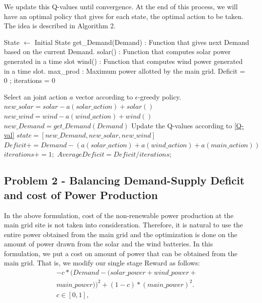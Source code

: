 \documentclass[conference]{IEEEtran}
\begin{document}
We update this Q-values until convergence. At the end of this process, we will have an optimal policy that gives for each state, the optimal action to be taken. The idea is described in  Algorithm 2. 

\begin{algorithm}
\caption{}
\label{q-learning}
\begin{algorithmic}[1]
	\State  State $\leftarrow$ Initial State 
    \State get\_Demand(Demand) : Function that gives next Demand based on the current Demand.
   \State solar() : Function that computes solar power generated in a time slot
    \State wind() : Function that computes wind power generated in a time slot.
    \State max\_prod : Maximum power allotted by the main grid.
    \State Deficit = 0 ; iterations = 0
     
     \State Select an joint action $a$ vector according to $\epsilon$-greedy policy.
     \State $new\_solar = solar - a(solar\_action) + solar()$
     \State $new\_wind = wind - a(wind\_action) + wind()$
     \State $new\_Demand = get\_Demand(Demand)$
     \State Update the Q-values according to \eqref{Q-val}
     \State $state = [new\_Demand, new\_solar, new\_wind]$
     \State $Deficit += Demand - (a(solar\_action) + a(wind\_action) + a(main\_action))$
     \State $iterations += 1;$
    \EndProcedure
    \State $Average Deficit = Deficit/iterations;$
\end{algorithmic}
\end{algorithm}


\subsection{Problem 2 - Balancing Demand-Supply Deficit and cost of Power Production}
In the above formulation, cost of the non-renewable power production at the main grid site is not taken into consideration. Therefore, it is natural to use the entire power obtained from the main grid and the optimization is done on the amount of power drawn from the solar and the wind batteries. In this formulation, we put a cost on amount of power that can be obtained from the main grid. That is, we modify our single stage Reward as follows:
\begin{equation}\label{prob2}
\begin{split}
 -c*(Demand - (solar\_power + wind\_power+ \\
 main\_power))^2+(1-c)*(main\_power)^2.\\
 c \in[0,1],
 \end{split}
\end{equation}
\end{document}
